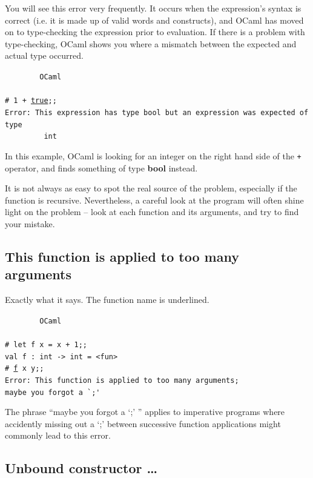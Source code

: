 \documentclass[]{book}
\newcommand{\smspace}{\vspace{4mm}}
\begin{document}
You will see this error very frequently. It occurs when the expression's syntax is correct (i.e. it is made up of valid words and constructs), and OCaml has moved on to type-checking the expression prior to evaluation. If there is a problem with type-checking, OCaml shows you where a mismatch between the expected and actual type occurred.

\smspace
\noindent\verb!        OCaml!\\
\noindent\\
\texttt{\# 1 + \underline{true};;}\\
\texttt{Error:\ This expression has type bool but an expression was expected of type}\\
\verb!         !\texttt{int}
\smspace

\noindent In this example, OCaml is looking for an integer on the right hand side of the \texttt{+} operator, and finds something of type \textrm{\textbf{bool}} instead.

It is not always as easy to spot the real source of the problem, especially if the function is recursive. Nevertheless, a careful look at the program will often shine light on the problem -- look at each function and its arguments, and try to find your mistake.

\subsection*{This function is applied to too many arguments}

Exactly what it says. The function name is underlined. 

\smspace
\noindent\verb!        OCaml!\\
\noindent\\
\texttt{\# let f x = x + 1;;}\\
\texttt{val f :\ int -> int = <fun>}\\
\texttt{\# \underline{f} x y;;}\\
\texttt{Error:\ This function is applied to too many arguments;}\\
\texttt{maybe you forgot a }\verb!`;'!
\smspace

\noindent The phrase ``maybe you forgot a `;' '' applies to imperative programs where accidently missing out a `;' between successive function applications might commonly lead to this error.

\subsection*{Unbound constructor \ldots}
\end{document}
